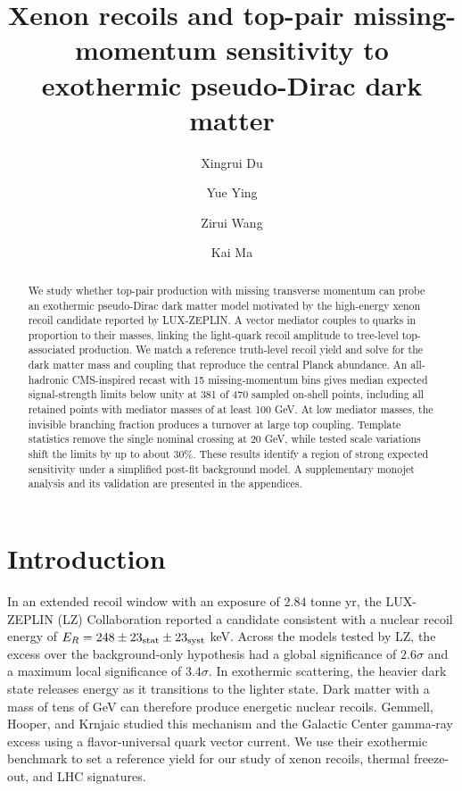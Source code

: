 \documentclass[aps,prd,reprint,superscriptaddress,longbibliography,floatfix]{revtex4-2}
\begin{document}
\title{Xenon recoils and top-pair missing-momentum sensitivity to exothermic pseudo-Dirac dark matter}
\author{Xingrui Du}
\author{Yue Ying}
\author{Zirui Wang}

\author{Kai Ma}


\begin{abstract}
We study whether top-pair production with missing transverse momentum can probe an exothermic pseudo-Dirac dark matter model motivated by the high-energy xenon recoil candidate reported by LUX-ZEPLIN. A vector mediator couples to quarks in proportion to their masses, linking the light-quark recoil amplitude to tree-level top-associated production. We match a reference truth-level recoil yield and solve for the dark matter mass and coupling that reproduce the central Planck abundance. An all-hadronic CMS-inspired recast with 15 missing-momentum bins gives median expected signal-strength limits below unity at 381 of 470 sampled on-shell points, including all retained points with mediator masses of at least 100 GeV. At low mediator masses, the invisible branching fraction produces a turnover at large top coupling. Template statistics remove the single nominal crossing at 20 GeV, while tested scale variations shift the limits by up to about 30\%. These results identify a region of strong expected sensitivity under a simplified post-fit background model. A supplementary monojet analysis and its validation are presented in the appendices.
\end{abstract}
\maketitle

\section{Introduction}
\label{sec:introduction}

In an extended recoil window with an exposure of $2.84$ tonne yr, the
LUX-ZEPLIN (LZ) Collaboration reported a candidate consistent with a
nuclear recoil energy of $E_R=248\pm23_{\rm stat}\pm23_{\rm syst}$ keV.
Across the models tested by LZ, the excess over the background-only
hypothesis had a global significance of $2.6\sigma$ and a maximum local
significance of $3.4\sigma$. In exothermic scattering, the heavier dark
state releases energy as it transitions to the lighter state. Dark
matter with a mass of tens of GeV can therefore produce energetic
nuclear recoils. Gemmell, Hooper, and Krnjaic studied this mechanism and
the Galactic Center gamma-ray excess using a flavor-universal quark
vector current. We use their exothermic benchmark to set a reference
yield for our study of xenon recoils, thermal freeze-out, and LHC
signatures. \cite{lz2026,gemmell2026}
\end{document}
